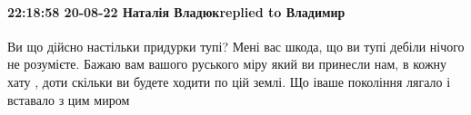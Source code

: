  
 
 
 
 

\paragraph{22:18:58 20-08-22 Наталія Владюкreplied to Владимир}

Ви що дійсно настільки придурки тупі? Мені вас шкода, що ви тупі дебіли нічого
не розумієте. Бажаю вам вашого руського міру який ви принесли нам, в кожну хату
, доти скільки ви будете ходити по цій землі. Що іваше покоління лягало і
вставало з цим миром
